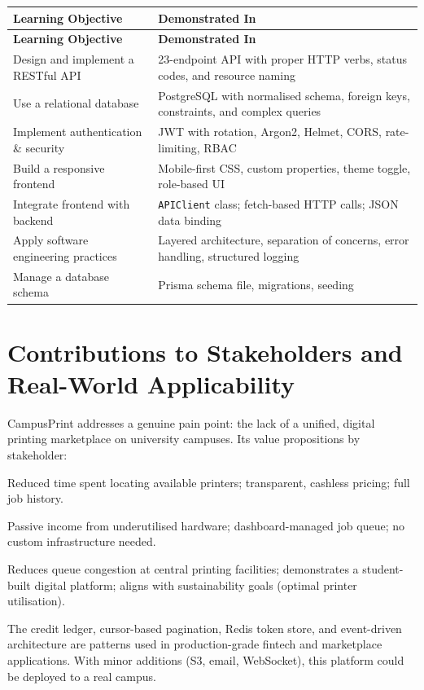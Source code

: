 \documentclass[12pt,a4paper]{report}
\begin{document}
\begin{longtable}{L{5.5cm} L{9cm}}
  \toprule
  \textbf{Learning Objective} & \textbf{Demonstrated In} \\
  \midrule
  \endfirsthead
  \midrule
  \textbf{Learning Objective} & \textbf{Demonstrated In} \\
  \midrule
  \endhead
  \bottomrule
  \endfoot
  Design and implement a RESTful API & 23-endpoint API with proper HTTP verbs, status codes, and resource naming \\
  Use a relational database & PostgreSQL with normalised schema, foreign keys, constraints, and complex queries \\
  Implement authentication \& security & JWT with rotation, Argon2, Helmet, CORS, rate-limiting, RBAC \\
  Build a responsive frontend & Mobile-first CSS, custom properties, theme toggle, role-based UI \\
  Integrate frontend with backend & \texttt{APIClient} class; fetch-based HTTP calls; JSON data binding \\
  Apply software engineering practices & Layered architecture, separation of concerns, error handling, structured logging \\
  Manage a database schema & Prisma schema file, migrations, seeding \\
\end{longtable}

\section{Contributions to Stakeholders and Real-World Applicability}

CampusPrint addresses a genuine pain point: the lack of a unified, digital printing
marketplace on university campuses. Its value propositions by stakeholder:

\begin{description}[leftmargin=2em, style=nextline]
  \item[Students] Reduced time spent locating available printers; transparent, cashless pricing;
    full job history.
  \item[Printer Owners] Passive income from underutilised hardware; dashboard-managed job
    queue; no custom infrastructure needed.
  \item[University] Reduces queue congestion at central printing facilities; demonstrates a
    student-built digital platform; aligns with sustainability goals (optimal printer utilisation).
  \item[Real-World Scalability] The credit ledger, cursor-based pagination, Redis token store,
    and event-driven architecture are patterns used in production-grade fintech and marketplace
    applications. With minor additions (S3, email, WebSocket), this platform could be deployed
    to a real campus.
\end{description}
\end{document}
